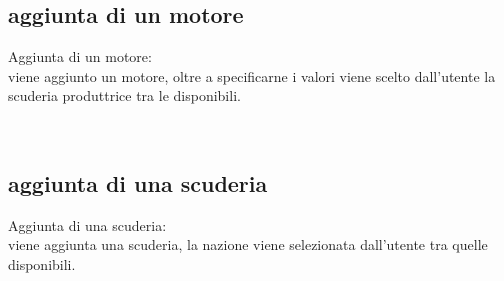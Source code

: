\documentclass[a4paper,12pt]{report}
\begin{document}
	\subsection{aggiunta di un motore}
	Aggiunta di un motore:\\
	viene aggiunto un motore, oltre a specificarne i valori viene scelto dall'utente
	la scuderia produttrice tra le disponibili.
	\begin{table}[!htb]
		\centering
		\begin{center}
		\end{center}
	\end{table}\\
	\subsection{aggiunta di una scuderia}
	Aggiunta di una scuderia:\\
	viene aggiunta una scuderia, la nazione viene selezionata dall'utente tra quelle disponibili.
	\begin{table}[!htb]
		\centering
		\begin{center}
		\end{center}
	\end{table}\\
\end{document}
